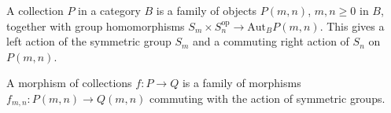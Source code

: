 A collection $P$ in a category $B$ is a family of objects $P(m, n)$, $m, n \geq 0$ in $B$, together with group homomorphisms $S_m \times S_n^{\text{op}} \rightarrow \text{Aut}_B P(m, n)$. This gives a left action of the symmetric group $S_m$ and a commuting right action of $S_n$ on $P(m, n)$.

A morphism of collections $f : P \rightarrow Q$ is a family of morphisms $f_{m,n} : P(m, n) \rightarrow Q(m, n)$ commuting with the action of symmetric groups.

